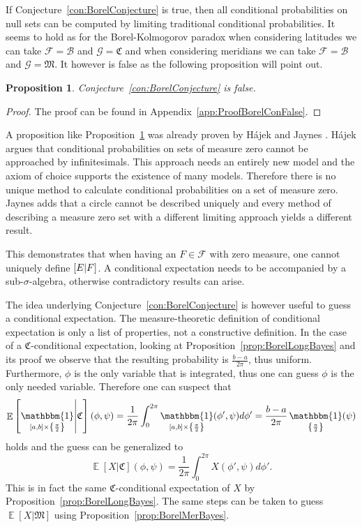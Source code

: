 \documentclass[a4paper]{report}
\theoremstyle{plain}
\newtheorem{proposition}[theorem]{Proposition}
\theoremstyle{definition}
\theoremstyle{remark}
\numberwithin{equation}{chapter}
\let\P\relax
\DeclareMathOperator{\P}{\mathbb{P}}
\DeclareMathOperator{\E}{\mathbb{E}}
\DeclareMathOperator{\1}{\mathbbm{1}}
\newcommand{\F}{\mathcal{F}}
\renewcommand{\G}{\mathcal{G}}
\newcommand{\B}{\mathcal{B}}
\begin{document}
If Conjecture~\ref{con:BorelConjecture} is true, then all conditional probabilities on null sets can be computed by limiting traditional conditional probabilities. It seems to hold as for the Borel-Kolmogorov paradox when considering latitudes we can take $\F=\B$ and $\G=\mathfrak{C}$ and when considering meridians we can take $\F=\B$ and $\G=\mathfrak{M}$. It however is false as the following proposition will point out.

\begin{proposition}\label{prop:BorelConFalse}
Conjecture~\ref{con:BorelConjecture} is false.
\end{proposition}
\begin{proof}
The proof can be found in Appendix~\ref{app:ProofBorelConFalse}.
\end{proof}

A proposition like Proposition~\ref{prop:BorelConFalse} was already proven by Hájek \cite{Hajek03} and Jaynes \cite{Jaynes03}. Hájek argues that conditional probabilities on sets of measure zero cannot be approached by infinitesimals. This approach needs an entirely new model and the axiom of choice supports the existence of many models. Therefore there is no unique method to calculate conditional probabilities on a set of measure zero. Jaynes adds that a circle cannot be described uniquely and every method of describing a measure zero set with a different limiting approach yields a different result.

This demonstrates that when having an $F\in\F$ with zero measure, one cannot uniquely define $\P[E|F]$. A conditional expectation needs to be accompanied by a sub-$\sigma$-algebra, otherwise contradictory results can arise.

The idea underlying Conjecture~\ref{con:BorelConjecture} is however useful to guess a conditional expectation. The measure-theoretic definition of conditional expectation is only a list of properties, not a constructive definition. In the case of a $\mathfrak{C}$-conditional expectation, looking at Proposition~\ref{prop:BorelLongBayes} and its proof we observe that the resulting probability is $\frac{b-a}{2\pi}$, thus uniform. Furthermore, $\phi$ is the only variable that is integrated, thus one can guess $\phi$ is the only needed variable. Therefore one can suspect that
\begin{equation}
\E\left[\1_{[a,b]\times\left\{\frac{\pi}{2}\right\}}\middle|\mathfrak{C}\right](\phi,\psi)=\frac{1}{2\pi}\int_0^{2\pi}\1_{[a,b]\times\left\{\frac{\pi}{2}\right\}}(\phi',\psi)d\phi'=\frac{b-a}{2\pi}\1_{\left\{\frac{\pi}{2}\right\}}(\psi)
\end{equation}
holds and the guess can be generalized to
\begin{equation}
\E[X|\mathfrak{C}](\phi,\psi)=\frac{1}{2\pi}\int_0^{2\pi}X(\phi',\psi)d\phi'.
\end{equation}
This is in fact the same $\mathfrak{C}$-conditional expectation of $X$ by Proposition~\ref{prop:BorelLongBayes}. The same steps can be taken to guess $\E[X|\mathfrak{M}]$ using Proposition~\ref{prop:BorelMerBayes}.
\end{document}
